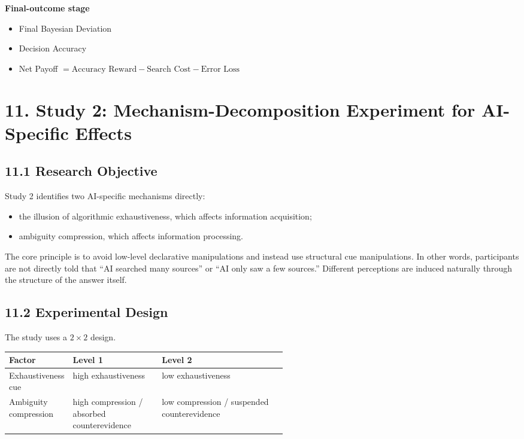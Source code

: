 \textbf{Final-outcome stage}
\begin{itemize}[leftmargin=1.5em]
\item Final Bayesian Deviation
\item Decision Accuracy
\item Net Payoff \(= \text{Accuracy Reward} - \text{Search Cost} - \text{Error Loss}\)
\end{itemize}

\section*{11. Study 2: Mechanism-Decomposition Experiment for AI-Specific Effects}

\subsection*{11.1 Research Objective}

Study 2 identifies two AI-specific mechanisms directly:
\begin{itemize}[leftmargin=1.5em]
\item the illusion of algorithmic exhaustiveness, which affects information acquisition;
\item ambiguity compression, which affects information processing.
\end{itemize}

The core principle is to avoid low-level declarative manipulations and instead use structural cue manipulations. In other words, participants are not directly told that ``AI searched many sources'' or ``AI only saw a few sources.'' Different perceptions are induced naturally through the structure of the answer itself.

\subsection*{11.2 Experimental Design}

The study uses a \(2 \times 2\) design.

\begin{center}
\begin{tabularx}{\linewidth}{>{\raggedright\arraybackslash}p{0.22\linewidth} >{\raggedright\arraybackslash}p{0.32\linewidth} >{\raggedright\arraybackslash}X}
\toprule
\textbf{Factor} & \textbf{Level 1} & \textbf{Level 2} \\
\midrule
Exhaustiveness cue & high exhaustiveness & low exhaustiveness \\
Ambiguity compression & high compression / absorbed counterevidence & low compression / suspended counterevidence \\
\bottomrule
\end{tabularx}
\end{center}

